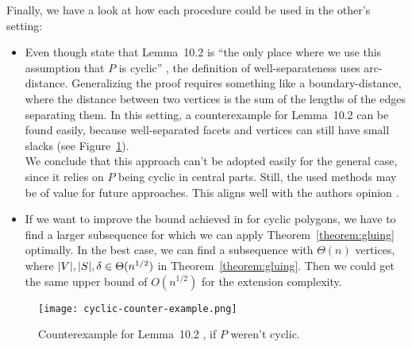 Finally, we have a look at how each procedure could be used in the other's setting:

\begin{itemize}
  \item Even though \citeauthor{kwan2020extension} state that Lemma~10.2 is ``the only place where we use this assumption that $P$ is cyclic'' \cite[22]{kwan2020extension}, the definition of well-separateness uses arc-distance. Generalizing the proof requires something like a boundary-distance, where the distance between two vertices is the sum of the lengths of the edges separating them. In this setting, a counterexample for Lemma~10.2 can be found easily, because well-separated facets and vertices can still have small slacks (see Figure~\ref{fig:cyclic-counter-example}).\\
        We conclude that this approach can't be adopted easily for the general case, since it relies on $P$ being cyclic in central parts. Still, the used methods may be of value for future approaches. This aligns well with the authors opinion \cite[28]{kwan2020extension}.
  \item If we want to improve the bound achieved in \textcite{shitov2020sublinear} for cyclic polygons, we have to find a larger subsequence for which we can apply Theorem~\ref{theorem:gluing} optimally. In the best case, we can find a subsequence with $\Theta(n)$ vertices, where $\lvert V\rvert,\lvert S\rvert,\delta \in \Theta(n^{1/2})$ in Theorem~\ref{theorem:gluing}. Then we could get the same upper bound of $O(n^{1/2})$ for the extension complexity.
\end{itemize}

\begin{figure}[ht]
  \centering
  \texttt{[image: cyclic-counter-example.png]}
  \caption{Counterexample for Lemma~10.2 \cite{kwan2020extension}, if $P$ weren't cyclic.}
  \label{fig:cyclic-counter-example}
\end{figure}
